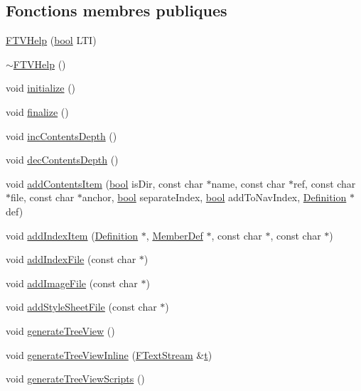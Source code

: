 \subsection*{Fonctions membres publiques}
\begin{DoxyCompactItemize}
\item 
\hyperlink{class_f_t_v_help_a7e7d72cccba33233dd89c6280b9ca101}{F\+T\+V\+Help} (\hyperlink{qglobal_8h_a1062901a7428fdd9c7f180f5e01ea056}{bool} L\+T\+I)
\item 
\hyperlink{class_f_t_v_help_aacb475096471a3b51feb4b247a41e27c}{$\sim$\+F\+T\+V\+Help} ()
\item 
void \hyperlink{class_f_t_v_help_a791c63d8c0dc72e7fedc4f17163dbfa3}{initialize} ()
\item 
void \hyperlink{class_f_t_v_help_a595c544e98100ca8aa84aaea4ac28e9f}{finalize} ()
\item 
void \hyperlink{class_f_t_v_help_a86381415dd788cb4a1a0feac8d5316d8}{inc\+Contents\+Depth} ()
\item 
void \hyperlink{class_f_t_v_help_a5949816300bc9d6a104dfd8305aa4e6f}{dec\+Contents\+Depth} ()
\item 
void \hyperlink{class_f_t_v_help_a33acc17460ca075c566e0e01d33a6ee4}{add\+Contents\+Item} (\hyperlink{qglobal_8h_a1062901a7428fdd9c7f180f5e01ea056}{bool} is\+Dir, const char $\ast$name, const char $\ast$ref, const char $\ast$file, const char $\ast$anchor, \hyperlink{qglobal_8h_a1062901a7428fdd9c7f180f5e01ea056}{bool} separate\+Index, \hyperlink{qglobal_8h_a1062901a7428fdd9c7f180f5e01ea056}{bool} add\+To\+Nav\+Index, \hyperlink{class_definition}{Definition} $\ast$def)
\item 
void \hyperlink{class_f_t_v_help_ab6a465f8d11ddb4766cbdb130c6bde7e}{add\+Index\+Item} (\hyperlink{class_definition}{Definition} $\ast$, \hyperlink{class_member_def}{Member\+Def} $\ast$, const char $\ast$, const char $\ast$)
\item 
void \hyperlink{class_f_t_v_help_af1158bffd161d730771c7dfc426b98a4}{add\+Index\+File} (const char $\ast$)
\item 
void \hyperlink{class_f_t_v_help_a1e3bbb2160fc857187fbc8c1dfbeb20d}{add\+Image\+File} (const char $\ast$)
\item 
void \hyperlink{class_f_t_v_help_a4b8566ef5fe3441f6e7e22bb7493f047}{add\+Style\+Sheet\+File} (const char $\ast$)
\item 
void \hyperlink{class_f_t_v_help_a0fe4b6eab80d4602256ee5edd59b78df}{generate\+Tree\+View} ()
\item 
void \hyperlink{class_f_t_v_help_aa5eeeb50fc575807ae4b0c6aa7c547bc}{generate\+Tree\+View\+Inline} (\hyperlink{class_f_text_stream}{F\+Text\+Stream} \&\hyperlink{058__bracket__recursion_8tcl_a69e959f6901827e4d8271aeaa5fba0fc}{t})
\item 
void \hyperlink{class_f_t_v_help_aad2b0bf5b5d217f8e0b77b486fed3527}{generate\+Tree\+View\+Scripts} ()
\end{DoxyCompactItemize}
